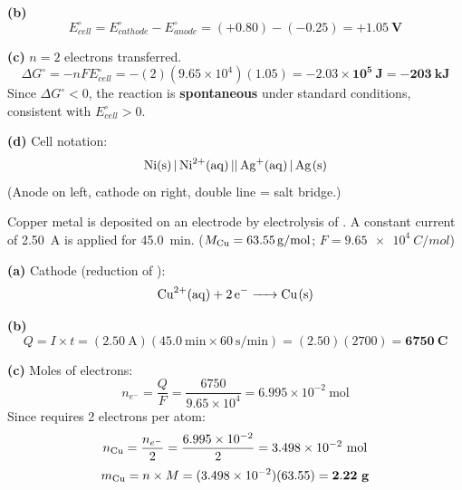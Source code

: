 \documentclass[addpoints]{exam}
\begin{document}
\begin{questions}
\begin{solution}[9cm]
\textbf{(b)}
\[
E^\circ_{cell} = E^\circ_{cathode} - E^\circ_{anode} = (+0.80) - (-0.25) = \mathbf{+1.05\ V}
\]

\textbf{(c)} $n = 2$ electrons transferred.
\[
\Delta G^\circ = -nFE^\circ_{cell} = -(2)(9.65\times10^4)(1.05) = -\mathbf{2.03\times10^5\ J
= -203\ kJ}
\]
Since $\Delta G^\circ < 0$, the reaction is \textbf{spontaneous} under standard conditions,
consistent with $E^\circ_{cell} > 0$.

\textbf{(d)} Cell notation:
\[
\ce{Ni(s) | Ni^{2+}(aq) || Ag+(aq) | Ag(s)}
\]
(Anode on left, cathode on right, double line = salt bridge.)
\end{solution}

\question Copper metal is deposited on an electrode by electrolysis of .
A constant current of \SI{2.50}{A} is applied for \SI{45.0}{min}.
($M_{\ce{Cu}} = \SI{63.55}{g/mol}$; $F = \SI{9.65e4}{C/mol}$)
\begin{solution}[9cm]
\textbf{(a)} Cathode (reduction of ):
\[
\ce{Cu^{2+}(aq) + 2e- -> Cu(s)}
\]

\textbf{(b)}
\[
Q = I \times t = (2.50\ \text{A})(45.0\ \text{min} \times 60\ \text{s/min})
= (2.50)(2700) = \mathbf{6750\ C}
\]

\textbf{(c)} Moles of electrons:
\[
n_{e^-} = \frac{Q}{F} = \frac{6750}{9.65\times10^4} = 6.995\times10^{-2}\ \text{mol}
\]
Since  requires 2 electrons per atom:
\[
n_{\ce{Cu}} = \frac{n_{e^-}}{2} = \frac{6.995\times10^{-2}}{2} = 3.498\times10^{-2}\ \text{mol}
\]
\[
m_{\ce{Cu}} = n \times M = (3.498\times10^{-2})(63.55) = \mathbf{2.22\ g}
\]


\end{solution}
\end{questions}
\end{document}
